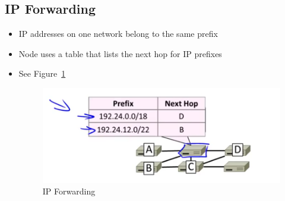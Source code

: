 \documentclass[12pt]{ctexart}   %
\begin{document}
	\subsection{IP Forwarding}
	\begin{itemize}
		\item IP addresses on one network belong to the same prefix
		\item Node uses a table that lists the next hop for IP prefixes
		\item See Figure~\ref{fig:4-5-1}
		
		\begin{figure}[h!] %
		\centering
		 \includegraphics[scale=0.7]{images/4-5-1}
		\caption{IP Forwarding}
		 \label{fig:4-5-1}
		 \end{figure}	
	\end{itemize}
	
\end{document}

